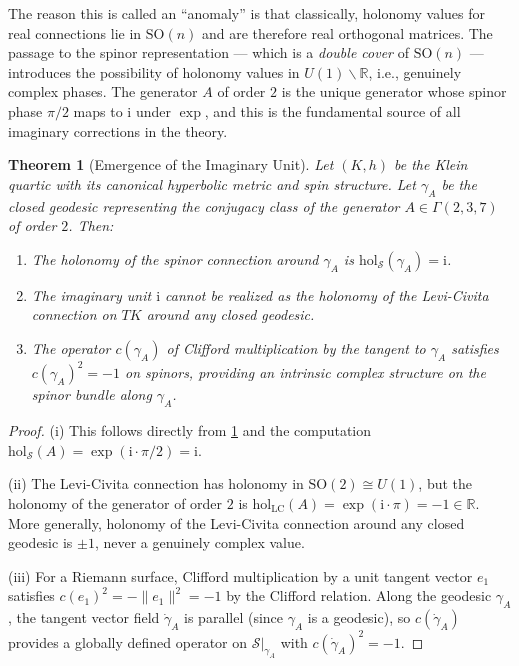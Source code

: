 \documentclass[12pt,a4paper]{article}
\newtheorem{theorem}{Theorem}[section]
\theoremstyle{definition}
\theoremstyle{remark}
\newcommand{\RR}{\mathbb{R}}
\newcommand{\SO}{\mathrm{SO}}
\newcommand{\hol}{\mathrm{hol}}
\newcommand{\LC}{\mathrm{LC}}
\newcommand{\cS}{\mathcal{S}}
\newcommand{\ii}{\mathrm{i}}
\begin{document}
The reason this is called an ``anomaly'' is that classically, holonomy values for real connections lie in $\SO(n)$ and are therefore real orthogonal matrices. The passage to the spinor representation --- which is a \emph{double cover} of $\SO(n)$ --- introduces the possibility of holonomy values in $U(1) \smallsetminus \RR$, i.e., genuinely complex phases. The generator $A$ of order $2$ is the unique generator whose spinor phase $\pi/2$ maps to $\ii$ under $\exp$, and this is the fundamental source of all imaginary corrections in the theory.

\begin{theorem}[Emergence of the Imaginary Unit]
\label{thm:imaginary}
Let $(K, h)$ be the Klein quartic with its canonical hyperbolic metric and spin structure. Let $\gamma_A$ be the closed geodesic representing the conjugacy class of the generator $A \in \Gamma(2,3,7)$ of order $2$. Then:
\begin{enumerate}[label=(\roman*)]
\item The holonomy of the spinor connection around $\gamma_A$ is $\hol_{\cS}(\gamma_A) = \ii$.
\item The imaginary unit $\ii$ cannot be realized as the holonomy of the Levi-Civita connection on $TK$ around any closed geodesic.
\item The operator $c(\gamma_A)$ of Clifford multiplication by the tangent to $\gamma_A$ satisfies $c(\gamma_A)^2 = -1$ on spinors, providing an intrinsic complex structure on the spinor bundle along $\gamma_A$.
\end{enumerate}
\end{theorem}

\begin{proof}
(i) This follows directly from \cref{thm:imaginary} and the computation $\hol_{\cS}(A) = \exp(\ii \cdot \pi/2) = \ii$.

(ii) The Levi-Civita connection has holonomy in $\SO(2) \cong U(1)$, but the holonomy of the generator of order $2$ is $\hol_{\LC}(A) = \exp(\ii \cdot \pi) = -1 \in \RR$. More generally, holonomy of the Levi-Civita connection around any closed geodesic is $\pm 1$, never a genuinely complex value.

(iii) For a Riemann surface, Clifford multiplication by a unit tangent vector $e_1$ satisfies $c(e_1)^2 = -\|e_1\|^2 = -1$ by the Clifford relation. Along the geodesic $\gamma_A$, the tangent vector field $\dot{\gamma}_A$ is parallel (since $\gamma_A$ is a geodesic), so $c(\dot{\gamma}_A)$ provides a globally defined operator on $\cS|_{\gamma_A}$ with $c(\dot{\gamma}_A)^2 = -1$.
\end{proof}
\end{document}
